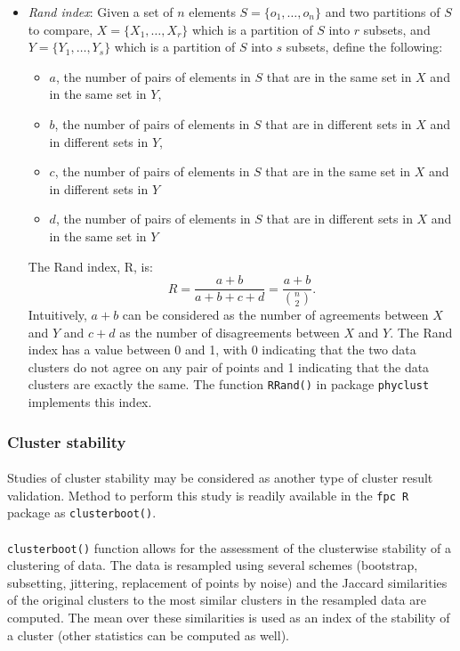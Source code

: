 \documentclass[10pt]{article}\usepackage[]{graphicx}\usepackage[]{color}
\begin{document}
\begin{itemize}
\item \textit{Rand index}:
\newline \newline
Given a set of $n$ elements $S = \{o_1, \ldots, o_n\}$ and two partitions of $S$
to compare, $X = \{X_1, \ldots, X_r\}$ which is a partition of $S$ into $r$ subsets, 
and $Y = \{Y_1, \ldots, Y_s\}$ which is a partition of $S$ into $s$ subsets, define the following:
\begin{itemize}
\item $a$, the number of pairs of elements in $S$ that are in the same set in $X$ and in the same set in $Y$,
\item $b$, the number of pairs of elements in $S$ that are in different sets in $X$ and in different sets in $Y$,
\item $c$, the number of pairs of elements in $S$ that are in the same set in $X$ and in different sets in $Y$
\item $d$, the number of pairs of elements in $S$ that are in different sets in $X$ and in the same set in $Y$
\end{itemize}
The Rand index, R, is:
$$R = \frac{a+b}{a+b+c+d} = \frac{a+b}{{n \choose 2 }}.$$
Intuitively, $a + b$ can be considered as the number of agreements between $X$ and $Y$ and $c + d$ as the number of disagreements between $X$ and $Y$.
\newline \newline
The Rand index has a value between 0 and 1, with 0 indicating that the two data clusters do not agree on any pair of points and 1 indicating that the data clusters are exactly the same.
\newline \newline
The function \texttt{RRand()} in package \texttt{phyclust} implements this index.
\end{itemize}


\subsubsection{Cluster stability}
\paragraph{}
Studies of cluster stability may be considered as another type of cluster result 
validation. Method to perform this study is readily available in the \texttt{fpc R} package as \texttt{clusterboot()}.
\paragraph{}
\texttt{clusterboot()} function allows for the assessment of the clusterwise stability of a clustering of data. The data is resampled using several schemes (bootstrap, subsetting, jittering, replacement of points by noise) and the Jaccard similarities of the original clusters to the most similar clusters in the resampled data are computed. The mean over these similarities is used as an index of the stability of a cluster (other statistics can be computed as well). 
\end{document}
